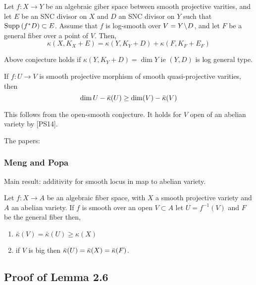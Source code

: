 \documentclass[12pt]{article}
\begin{document}
\begin{conj}
Let $f : X \to Y$ be an algebraic giber space between smooth projective varities, and let $E$ be an SNC divisor on $X$ and $D$ an SNC divisor on $Y$ such that $\mathrm{Supp}_{}\left(f^* D \right) \subset E$. Assume that $f$ is log-smooth over $V = Y\! \setminus \! D$, and let $F$ be a general fiber over a point of $V$. Then,
\[ \kappa(X, K_X + E) = \kappa(Y, K_Y + D) + \kappa(F, K_F + E_F) \]
\end{conj}

\begin{theorem}
Above conjecture holds if $\kappa(Y, K_Y + D) = \dim{Y}$ ie $(Y, D)$ is log general type.
\end{theorem}

\begin{conj}
If $f : U \to V$ is smooth projective morphism of smooth quasi-projective varities, then
\[ \dim{U} - \bar{\kappa}(U) \ge \dim(V) - \bar{\kappa}(V) \]
\end{conj}

\begin{rmk}
This follows from the open-smooth conjecture. It holds for $V$ open of an abelian variety by [PS14].
\end{rmk}

The papers:

\subsubsection{Meng and Popa}

Main result: additivity for smooth locus in map to abelian variety.

\begin{theorem}
Let $f : X \to A$ be an algebraic fiber space, with $X$ a smooth projective variety and $A$ an abelian variety. If $f$ is smooth over an open $V \subset A$ let $U = f^{-1}(V)$  and $F$ be the general fiber then,
\begin{enumerate}
\item $\bar{\kappa}(V) = \bar{\kappa}(U) \ge \kappa(X)$
\item if $V$ is big then $\bar{\kappa}(U) = \bar{\kappa}(X) = \bar{\kappa}(F)$. 
\end{enumerate}
\end{theorem}

\subsection{Proof of Lemma 2.6}
\end{document}
